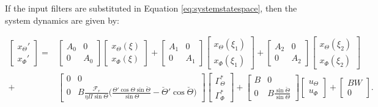 \documentclass[main.tex]{subfiles}
\begin{document}
	
	If the input filters are substituted in Equation \eqref{eq:systemstatespace}, then the system dynamics are given by:
	
	\begin{align}
	\begin{bmatrix}
	x_\Theta' \\
	x_\Phi'
	\end{bmatrix} =&
	\begin{bmatrix}
	A_0 & 0 \\
	0 & A_0
	\end{bmatrix}
	\begin{bmatrix}
	x_\Theta(\xi) \\
	x_\Phi(\xi)
	\end{bmatrix} + 
	\begin{bmatrix}
	A_1 & 0 \\
	0 & A_1
	\end{bmatrix}
	\begin{bmatrix}
	x_\Theta(\xi_1) \\
	x_\Phi(\xi_1)
	\end{bmatrix} +
	\begin{bmatrix}
	A_2 & 0 \\
	0 & A_2
	\end{bmatrix}
	\begin{bmatrix}
	x_\Theta(\xi_2) \\
	x_\Phi(\xi_2)
	\end{bmatrix} \nonumber\\
	+& \begin{bmatrix}
	0 & 0 \\
	0 & B\frac{\mathcal{F}_r}{\eta \Pi \sin \Theta} \bigg( \frac{\Theta' \cos \Theta \sin \check{\Theta}}{\sin \Theta}  - \check{\Theta}' \cos \check{\Theta}\bigg)
	\end{bmatrix}
	\begin{bmatrix}
	\Gamma_\Theta^* \\
	\Gamma_\Phi^*
	\end{bmatrix} + \begin{bmatrix}
	B & 0 \\
	0 & B\frac{\sin \check{\Theta}}{\sin \Theta}
	\end{bmatrix}
	\begin{bmatrix}
	u_\Theta \\
	u_\Phi
	\end{bmatrix} +
	\begin{bmatrix}
	BW \\
	0
	\end{bmatrix}.
	\label{eq:systemstatespace2}	
	\end{align}
	
\end{document}
